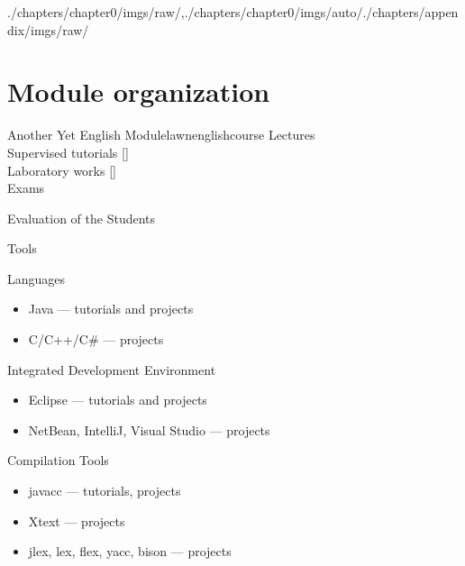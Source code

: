 \begin{graphicspathcontext}{{./chapters/chapter0/imgs/raw/},{./chapters/chapter0/imgs/auto/}{./chapters/appendix/imgs/raw/}}
\section{Module organization}

\begin{leftlawnframe}{{Another Yet} English Module}{lawnenglishcourse}
	Lectures  \\[.5cm]
	Supervised tutorials  [] \\[.5cm]
	Laboratory works  [] \\[.5cm]
	Exams 
\end{leftlawnframe}

\begin{gridframe}{Evaluation of the Students}
\end{gridframe}

\begin{frame}[background=6]{Tools}
	\begin{block}{Languages}
		\begin{itemize}
			\item Java --- tutorials and projects
			\item C/C++/C\# --- projects
		\end{itemize}
	\end{block}
	\begin{block}{Integrated Development Environment}
		\begin{itemize}
			\item Eclipse --- tutorials and projects
			\item NetBean, IntelliJ, Visual Studio --- projects
		\end{itemize}
	\end{block}
	\begin{block}{Compilation Tools}
		\begin{itemize}
			\item javacc --- tutorials, projects
			\item Xtext --- projects
			\item jlex, lex, flex, yacc, bison --- projects
		\end{itemize}
	\end{block}
\end{frame}


\end{graphicspathcontext}
